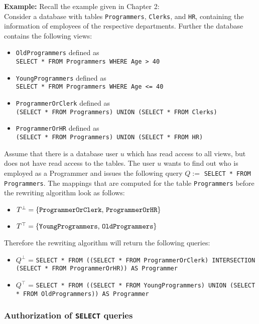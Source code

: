 \smallskip
\noindent
{\bf Example:}
Recall the example given in Chapter 2:
\\
Consider a database with tables \texttt{Programmers}, \texttt{Clerks}, and \texttt{HR}, containing the information of employees of the respective departments.
%
Further the database contains the following views:
\begin{itemize}
	\item \texttt{OldProgrammers} defined as \\ \texttt{SELECT * FROM Programmers WHERE Age > 40}
	\item \texttt{YoungProgrammers} defined as \\ \texttt{SELECT * FROM Programmers WHERE Age <= 40}
	\item \texttt{ProgrammerOrClerk} defined as \\ \texttt{(SELECT * FROM Programmers) UNION (SELECT * FROM Clerks)}
	\item \texttt{ProgrammerOrHR} defined as \\ \texttt{(SELECT * FROM Programmers) UNION (SELECT * FROM HR)}
\end{itemize}
%
Assume that there is a database user $u$ which has read access to all views, but does not have read access to the tables.
%
The user $u$ wants to find out who is employed as a Programmer and issues the following query $Q := $ \texttt{SELECT * FROM Programmers}.
%
The mappings that are computed for the table \texttt{Programmers} before the rewriting algorithm look as follows:
\begin{itemize}
	\item $T^\bot = \lbrace \text{\texttt{ProgrammerOrClerk}, \texttt{ProgrammerOrHR}} \rbrace$
	\item $T^\top = \lbrace \text{\texttt{YoungProgrammers}, \texttt{OldProgrammers}} \rbrace$
\end{itemize}
%
Therefore the rewriting algorithm will return the following queries:
\begin{itemize}
	\item $Q^\bot$ = \texttt{SELECT * FROM ((SELECT * FROM ProgrammerOrClerk) INTERSECTION (SELECT * FROM ProgrammerOrHR)) AS Programmer}
	\item $Q^\top$ = \texttt{SELECT * FROM ((SELECT * FROM YoungProgrammers) UNION (SELECT * FROM OldProgrammers)) AS Programmer}
\end{itemize}

\subsubsection{Authorization of \texttt{SELECT} queries}

